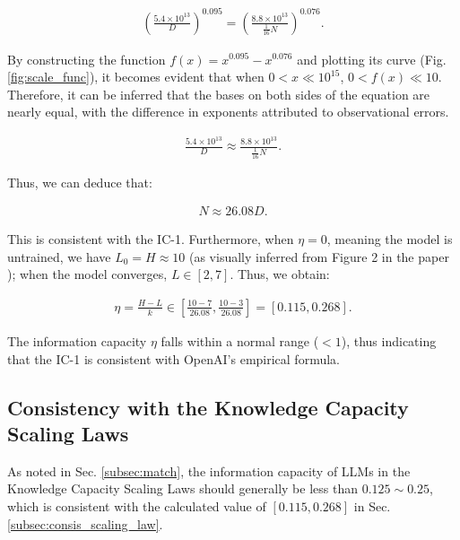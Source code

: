 \documentclass{article}
\theoremstyle{plain}
\theoremstyle{definition}
\theoremstyle{remark}
\begin{document}
\begin{equation*}
\begin{aligned}
    \left(\frac{5.4 \times 10^{13}}{D}\right)^{0.095} = \left(\frac{8.8 \times 10^{13}}{\frac{1}{16}N}\right)^{0.076}.
\end{aligned}
\end{equation*}

By constructing the function $f(x)=x^{0.095}-x^{0.076}$ and plotting its curve (Fig. \ref{fig:scale_func}), it becomes evident that when $0 < x \ll 10^{15} $, $0 < f(x) \ll 10$. Therefore, it can be inferred that the bases on both sides of the equation are nearly equal, with the difference in exponents attributed to observational errors.

\begin{equation*}
\begin{aligned}
    \frac{5.4 \times 10^{13}}{D} \approx \frac{8.8 \times 10^{13}}{\frac{1}{16}N}.
\end{aligned}
\end{equation*}

Thus, we can deduce that:

\begin{equation*}
\begin{aligned}
    N \approx 26.08D.
\end{aligned}
\end{equation*}

This is consistent with the IC-1. Furthermore, when $\eta = 0$, meaning the model is untrained, we have $L_0 = H \approx 10$ (as visually inferred from Figure 2 in the paper \cite{ScalingLaw1_2020}); when the model converges, $L \in [2,7] $. Thus, we obtain:

\begin{equation*}
\begin{aligned}
    \eta = \frac{H-L}{k} \in \left[\frac{10-7}{26.08}, \frac{10-3}{26.08} \right] = [0.115, 0.268].
\end{aligned}
\end{equation*}

The information capacity $\eta$ falls within a normal range ($<1$), thus indicating that the IC-1 is consistent with OpenAI's empirical formula.

\subsection{Consistency with the Knowledge Capacity Scaling Laws}

As noted in Sec. \ref{subsec:match}, the information capacity of LLMs in the Knowledge Capacity Scaling Laws should generally be less than $0.125\sim 0.25$, which is consistent with the calculated value of $[0.115,0.268]$ in Sec. \ref{subsec:consis_scaling_law}.
\end{document}
